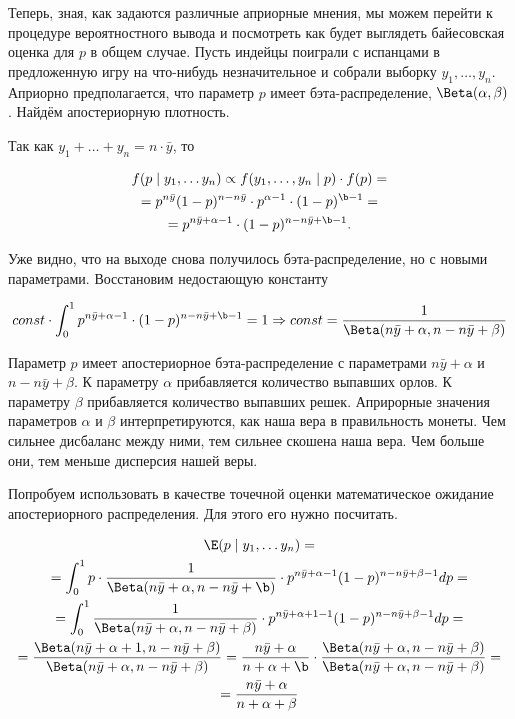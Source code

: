 Теперь, зная, как задаются различные априорные мнения, мы можем перейти к процедуре вероятностного вывода и посмотреть как будет выглядеть байесовская оценка для $p$ в общем случае. Пусть индейцы поиграли с испанцами в предложенную игру на что-нибудь незначительное и собрали выборку $y_1, \ldots, y_n$.  Априорно предполагается, что параметр $p$ имеет бэта-распределение, $\Beta(\alpha,\beta)$. Найдём апостериорную плотность. 

Так как  $y_1 + \ldots + y_n = n \cdot \bar{y} $, то

\begin{multline*}
f(p \mid y_1 , \ldots y_n) \propto f(y_1, \ldots, y_n \mid p) \cdot f(p) = \\ =   p^{n \bar y}(1-p)^{n-n \bar y} \cdot p^{\alpha - 1} \cdot (1-p)^{\b - 1}   = \\ =  p^{n \bar y + \alpha - 1} \cdot (1-p)^{n - n\bar y + \b - 1}. 
\end{multline*}

Уже видно, что на выходе снова получилось бэта-распределение, но с новыми параметрами. Восстановим недостающую константу

\[ const \cdot \int_0^1 p^{n \bar y + \alpha - 1} \cdot (1-p)^{n - n\bar y + \b - 1} = 1 \Rightarrow  const = \frac{1}{\Beta(n \bar y + \alpha, n-n \bar y + \beta)} \]

Параметр $p$ имеет апостериорное бэта-распределение с параметрами $n \bar y + \alpha$ и $ n - n \bar y + \beta$.  К параметру $\alpha$ прибавляется количество выпавших орлов. К параметру $\beta$ прибавляется количество выпавших решек. Априрорные значения параметров $\alpha$ и $\beta$  интерпретируются, как наша вера в правильность монеты. Чем сильнее дисбаланс между ними, тем сильнее скошена наша вера. Чем больше они, тем меньше дисперсия нашей веры. 

Попробуем использовать в качестве точечной оценки математическое ожидание апостериорного распределения. Для этого его нужно посчитать. 

	\begin{multline*}
\E(p \mid y_1, \ldots y_n)  = \\ =  \int_0^1 p \cdot \frac{1}{\Beta(n \bar y + \alpha,n-n \bar y + \b)} \cdot p^{n \bar y + \alpha - 1} (1-p)^{n - n \bar{y} + \beta - 1} dp = \\ = \int_0^1 \frac{1}{\Beta(n \bar y + \alpha ,n-n \bar y + \beta)} \cdot p^{n \bar y + \alpha + 1 - 1} (1-p)^{n - n \bar{y} + \beta - 1} dp =  \\ =   \frac{\Beta(n \bar y + \alpha + 1,n-n \bar y + \beta)}{\Beta(n \bar y + \alpha, n-n \bar y + \beta)} =  \frac{n \bar y + \alpha}{n + \alpha + \b} \cdot \frac{\Beta(n \bar y + \alpha,n-n \bar y + \beta)}{\Beta(n \bar y + \alpha, n-n \bar y + \beta)} = \\ =\frac{n \bar y + \alpha}{n + \alpha + \beta}
\end{multline*}

